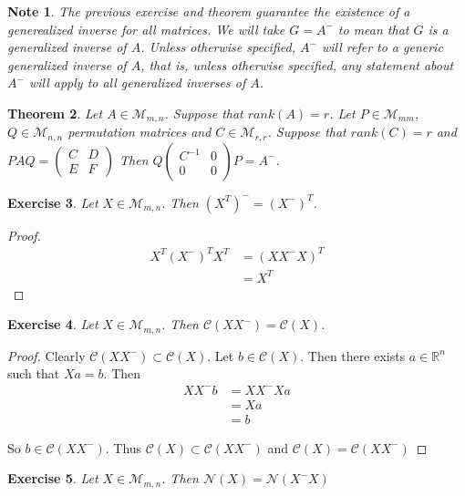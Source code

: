 \documentclass[12pt]{amsart}
\newtheorem{thm}{Theorem}[section]
\newtheorem{note}[thm]{Note}
\newtheorem{ex}[thm]{Exercise}
\newcommand{\R}{\mathbb{R}}
\newcommand{\MC}{\mathcal{C}}
\newcommand{\MN}{\mathcal{N}}
\newcommand{\MM}{\mathcal{M}}
\newcommand{\z}[1]{Let ${#1} \in \MM_{m,n}$}
\begin{document}
\begin{note}
The previous exercise and theorem guarantee the existence of a generealized inverse for all matrices.
We will take $G = A^-$ to mean that $G$ is a generalized inverse of $A$. Unless otherwise specified, $A^-$ will refer to a generic generalized inverse of $A$, that is, unless otherwise specified, any statement about $A^-$ will apply to all generalized inverses of $A$.
\end{note}

\begin{thm}
Let $A \in \MM_{m,n}$. Suppose that $rank(A) = r$. Let $P \in \MM_{mm}$, $Q \in \MM_{n,n}$ permutation matrices and $C \in \MM_{r,r}$. Suppose that $rank(C) = r$ and $PAQ = \begin{pmatrix}
C &D \\
E &F
\end{pmatrix}$ Then $Q\begin{pmatrix}
C^{-1} &0 \\
0 &0
\end{pmatrix}P = A^-$. 
\end{thm}

\begin{ex}
\z{X}. Then $(X^T)^- = (X^-)^T$.
\end{ex}

\begin{proof}
\begin{align*}
X^T(X^-)^TX^T
&= (X X^- X)^T\\
&= X^T
\end{align*}
\end{proof}

\begin{ex}
\z{X}. Then $\MC(XX^-) = \MC(X)$. 
\end{ex}

\begin{proof}
Clearly $\MC(XX^-) \subset \MC(X)$. Let $b \in \MC(X)$. Then there exists $a \in \R^n$ such that $Xa = b$. Then 
\begin{align*}
XX^-b 
&= XX^-Xa \\
&= Xa \\
&= b
\end{align*}

So $b \in \MC(XX^-)$. Thus $\MC(X) \subset \MC(XX^-)$ and $\MC(X) = \MC(XX^-)$
\end{proof}

\begin{ex}
\z{X}. Then $\MN(X) = \MN(X^-X)$
\end{ex}
\end{document}
